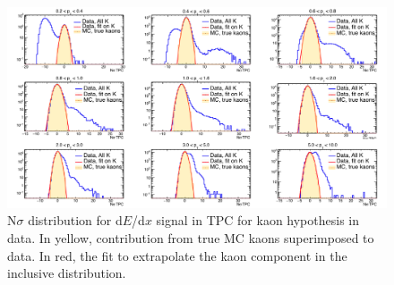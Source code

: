 \begin{figure}[!h]
 \centering
 \includegraphics[angle=0, width=15cm]{./FigCap5/KaonTPCFromTOF_DataMC.png}
 \caption{N$\sigma$ distribution for d$E$/d$x$ signal in TPC for kaon hypothesis in data. In yellow, contribution from true MC kaons superimposed to data. In red, the fit to extrapolate the kaon component in the inclusive distribution.}
 \label{fig:DataKaonsTPC} 
\end{figure}

